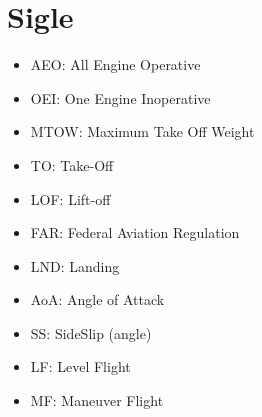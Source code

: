 \section{Sigle}
\begin{itemize}
    \item AEO: All Engine Operative
    \item OEI: One Engine Inoperative
    \item MTOW: Maximum Take Off Weight
    \item TO: Take-Off
    \item LOF: Lift-off 
    \item FAR: Federal Aviation Regulation
    \item LND: Landing
    \item AoA: Angle of Attack
    \item SS: SideSlip (angle)
    \item LF: Level Flight
    \item MF: Maneuver Flight
    
\end{itemize}

